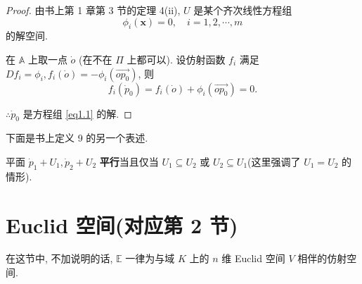 \documentclass{ctexart}
\begin{document}
\begin{proof}
    由书上第 1 章第 3 节的定理 4(ii), $U$ 是某个齐次线性方程组
    \[\phi_i(\boldsymbol{x})=0,\quad i=1,2,\cdots,m\]
    的解空间.

    在 $\mathbb{A}$ 上取一点 $\dot{o}$ (在不在 $\varPi$ 上都可以). 设仿射函数 $f_i$ 满足 $Df_i=\phi_i,f_i(\dot{o})=-\phi_i(\overrightarrow{op_0})$, 则
    \[f_i(\dot{p}_0)=f_i(\dot{o})+\phi_i(\overrightarrow{op_0})=0.\]

    $\therefore\dot{p}_0$ 是方程组 \ref{eq1.1} 的解.
\end{proof}
下面是书上定义 9 的另一个表述.
\begin{definition}
    平面 $\dot{p}_1+U_1,\dot{p}_2+U_2$ \textbf{平行}当且仅当 $U_1\subseteq U_2$ 或 $U_2\subseteq U_1$(这里强调了 $U_1=U_2$ 的情形).
\end{definition}
\section{Euclid 空间(对应第 2 节)}
在这节中, 不加说明的话, $\mathbb{E}$ 一律为与域 $K$ 上的 $n$ 维 Euclid 空间 $V$ 相伴的仿射空间.
\end{document}
